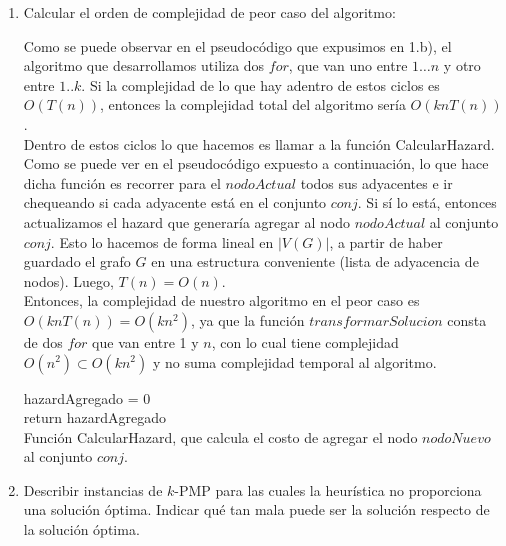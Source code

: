 \documentclass[11pt, a4paper, twoside]{article}
\begin{document}
\begin{enumerate}
		\item Calcular el orden de complejidad de peor caso del algoritmo:
		
		Como se puede observar en el pseudocódigo que expusimos en 1.b), el algoritmo que desarrollamos utiliza dos $for$, 
		que van uno entre $1 \dots n$ y otro entre $1..k$.
		Si la complejidad de lo que hay adentro de estos ciclos es $O(T(n))$, entonces la complejidad total
		del algoritmo sería $O(knT(n))$. \\
		Dentro de estos ciclos lo que hacemos es llamar a la función CalcularHazard. Como se puede ver en el pseudocódigo
		expuesto a continuación, lo que hace dicha función es
		recorrer para el $nodoActual$ todos sus adyacentes e ir chequeando si cada adyacente está en el conjunto $conj$. 
		Si sí lo está, entonces actualizamos el hazard que generaría agregar al nodo $nodoActual$ al conjunto $conj$. 
		Esto lo hacemos de forma lineal 
		en $|V(G)|$, a partir de haber guardado el grafo $G$ en una estructura conveniente (lista de adyacencia 
		de nodos). Luego, $T(n) = O(n)$. \\
		Entonces, la complejidad de nuestro algoritmo en el peor caso es $ O(knT(n)) = O(k n^2)$, ya que la función 
		$transformarSolucion$ consta de dos $for$ que van entre 1 y $n$, con lo cual tiene complejidad 
		$O(n^2) \subset O(k n^2) $ y no suma complejidad temporal al algoritmo.
		
		
		\begin{algorithm}[H]
		  hazardAgregado = 0 \\
		  return hazardAgregado \\
		\caption {Función CalcularHazard, que calcula el costo de agregar el nodo $nodoNuevo$ al conjunto $conj$.}
		\end{algorithm}
		
		
		\item Describir instancias de $k$-PMP para las cuales la heurística no proporciona una solución
		óptima. Indicar qué tan mala puede ser la solución respecto de la solución óptima.
		

\end{enumerate}
\end{document}
